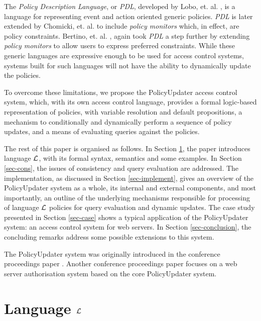 \documentclass[global,twocolumn,final]{svjour}
\begin{document}
    The {\em Policy Description Language}, or {\em PDL}, developed by Lobo,
    et. al. \cite{LOB}, is a language for representing event and action
    oriented generic policies. {\em PDL} is later extended by Chomicki, et. al.
    \cite{CHO} to include {\em policy monitors} which, in effect, are policy
    constraints. Bertino, et. al. \cite{BE2}, again took {\em PDL} a step
    further by extending {\em policy monitors} to allow users to express
    preferred constraints. While these generic languages are expressive enough
    to be used for access control systems, systems built for such languages
    will not have the ability to dynamically update the policies.

    To overcome these limitations, we propose the PolicyUpdater access control
    system, which, with its own access control language, provides a formal
    logic-based representation of policies, with variable resolution and
    default propositions, a mechanism to conditionally and dynamically
    perform a sequence of policy updates, and a means of evaluating queries
    against the policies.

     The rest of this paper is organised as follows. In Section \ref{sec-langl},
    the paper introduces language ${\cal L}$, with its formal syntax, semantics
    and some examples. In Section \ref{sec-cons}, the issues of consistency and
    query evaluation are addressed. The implementation, as discussed in Section
    \ref{sec-implement}, gives an overview of the PolicyUpdater system as
    a whole, its internal and external components, and most importantly, an
    outline of the underlying mechanisms responsible for processing of language
    ${\cal L}$ policies for query evaluation and dynamic updates. The case
    study presented in Section \ref{sec-case} shows a typical application of
    the PolicyUpdater system: an access control system for web servers. In
    Section \ref{sec-conclusion}, the concluding remarks address some
    possible extensions to this system.

    The PolicyUpdater system was originally introduced in the conference
    proceedings paper \cite{CR1}. Another conference proceedings paper
    \cite{CR2} focuses on a web server authorisation system based on the
    core PolicyUpdater system.

  \section{Language $\cal{L}$}
    \label{sec-langl}
\end{document}
